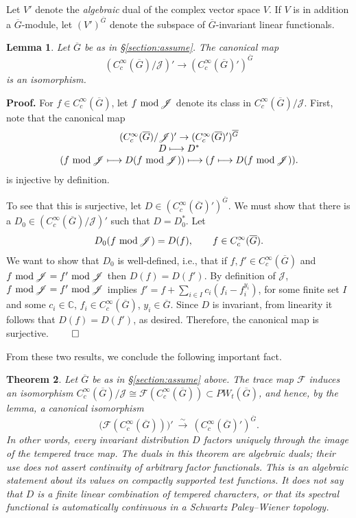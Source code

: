 \documentclass[12pt,letterpaper]{article}
\newtheorem{theorem}{Theorem}[section]
\newtheorem{lemma}[theorem]{Lemma}
\theoremstyle{definition}
\theoremstyle{remark}
\newcommand{\C}{\mathbb C}
\newcommand{\sF}{\mathscr F}
\newcommand{\sJ}{\mathscr J}
\begin{document}
Let $V'$ denote the \emph{algebraic} dual of the complex vector space $V$.
If $V$ is in addition a $\overline{G }$-module, let 
$(V')^{\overline{G }}$ denote the
subspace of $\overline{G }$-invariant linear functionals.

\begin{lemma}
Let $\overline{G}$ be as in \S \ref{section:assume}. The canonical map
\[
(C_c^\infty(\overline{G })/\sJ)' 
\rightarrow (C_c^\infty(\overline{G })')^{\overline{G }}
\]
is an isomorphism.
\end{lemma}

\noindent
{\bf Proof.}
For $f\in C_c^\infty(\overline{G })$, let $f\ {\rm mod}\, \sJ$ 
denote its class in
$C_c^\infty(\overline{G })/\sJ$. First, note that the canonical map
\[
\begin{array}{c}
(C_c^\infty(\overline{G })/\sJ)'
\rightarrow (C_c^\infty(\overline{G })')^{\overline{G }}\\
D \longmapsto D^*\\
(f\ {\rm mod}\, \sJ\longmapsto D(f\ {\rm mod}\, \sJ)) \longmapsto
(f\longmapsto D(f\ {\rm mod}\, \sJ)).
\end{array}
\]
is injective by definition.

To see that this is surjective, let 
$D\in (C_c^\infty(\overline{G })')^{\overline{G }}$.
We must show that there is a $D_0\in (C_c^\infty(\overline{G })/\sJ)'$
such that $D=D_0^*$. Let
\[
D_0(f\ {\rm mod}\, \sJ)=D(f),\ \ \ \ \ \ f\in C_c^\infty(\overline{G }).
\]
We want to show that $D_0$ is well-defined,
i.e., that if $f,f'\in C_c^\infty(\overline{G })$ and
$f\ {\rm mod}\, \sJ=f'\ {\rm mod}\, \sJ$ then $D(f)=D(f')$.
By definition of $\sJ$, $f\ {\rm mod}\, \sJ=f'\ {\rm mod}\, \sJ$ implies
$f'=f+\sum_{i\in I}c_i(f_i-f_i^{y_i})$, for some finite set $I$ and
some $c_i\in {\C}$, $f_i\in C_c^\infty(\overline{G })$,
$y_i\in \overline{G }$. Since $D$ is invariant, from linearity it follows
that $D(f)=D(f')$, as desired. Therefore, the canonical map is 
surjective.
$\qed$

From these two results, we conclude the following
important fact.

\begin{theorem}
\label{thm:trace}
Let $\overline{G}$ be as in \S \ref{section:assume} above. The trace map $\sF$
induces an isomorphism $C_c^\infty(\overline{G})/\sJ\cong\sF(C_c^\infty(\overline{G}))\subset PW_t(\overline{G})$,
and hence, by the lemma, a canonical isomorphism
\[
\bigl(\sF(C_c^\infty(\overline{G}))\bigr)' 
\ \xrightarrow{\ \sim\ }\ (C_c^\infty(\overline{G })')^{\overline{G }}.
\]
In other words, every invariant distribution $D$ factors uniquely through the image of the tempered trace map. The duals in this theorem are algebraic duals; their use does not assert continuity of arbitrary factor functionals.  This is an algebraic statement about its values on compactly supported test functions.  It does not say that $D$ is a finite linear combination of tempered characters, or that its spectral functional is automatically continuous in a Schwartz Paley--Wiener topology.
\end{theorem}
\end{document}
